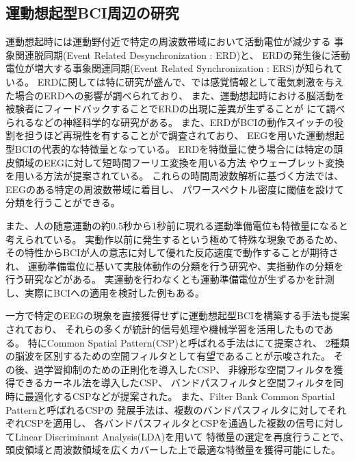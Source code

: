 \subsection{\mc 運動想起型\rm BCI\mc 周辺の研究}
運動想起時には運動野付近で特定の周波数帯域において活動電位が減少する
事象関連脱同期(Event Related Desynchronization : ERD)と、
ERDの発生後に活動電位が増大する事象関連同期(Event Related Synchronization : ERS)が知られている\cite{ERDとERS}。
ERDに関しては特に研究が盛んで、\cite{ERDリハビリ}では感覚情報として電気刺激を与えた場合のERDへの影響が調べられており、
また、運動想起時における脳活動を被験者にフィードバックすることでERDの出現に差異が生ずることが\cite{運動フィードバック}
にて調べられるなどの神経科学的な研究がある。
また、ERDがBCIの動作スイッチの役割を担うほど再現性を有することが\cite{Beta波によるBCI}で調査されており、
EEGを用いた運動想起型BCIの代表的な特徴量となっている。
ERDを特徴量に使う場合には特定の頭皮領域のEEGに対して短時間フーリエ変換を用いる方法
\cite{プリミティブERD}やウェーブレット変換を用いる方法\cite{waveletFSVM}が提案されている。
これらの時間周波数解析に基づく方法では、EEGのある特定の周波数帯域に着目し、
パワースペクトル密度に閾値を設けて分類を行うことができる。

また、人の随意運動の約0.5秒から1秒前に現れる運動準備電位も特徴量になると考えられている。
実動作以前に発生するという極めて特殊な現象であるため、
その特性からBCIが人の意志に対して優れた反応速度で動作することが期待され、
運動準備電位に基いて実肢体動作の分類を行う研究\cite{運動準備電位肢体}や、実指動作の分類を行う研究\cite{運動準備電位指}などがある。
実運動を行わなくとも運動準備電位が生ずるかを計測し\cite{運動準備電位想起}、実際にBCIへの適用を検討した例\cite{運動準備電位想起2}もある。

一方で特定のEEGの現象を直接獲得せずに運動想起型BCIを構築する手法も提案されており、
それらの多くが統計的信号処理や機械学習を活用したものである。
特にCommon Spatial Pattern(CSP)と呼ばれる手法は\cite{CSP1990}にて提案され、
2種類の脳波を区別するための空間フィルタとして有望であることが示唆された。
その後、過学習抑制のための正則化を導入したCSP\cite{正則化CSP}、
非線形な空間フィルタを獲得できるカーネル法を導入したCSP\cite{カーネルCSP}、
バンドパスフィルタと空間フィルタを同時に最適化するCSP\cite{csssp}などが提案された。
また、Filter Bank Common Spartial Pattern\cite{fbcsp}と呼ばれるCSPの
発展手法は、複数のバンドパスフィルタに対してそれぞれCSPを適用し、
各バンドパスフィルタとCSPを通過した複数の信号に対してLinear Discriminant Analysis(LDA)を用いて
特徴量の選定を再度行うことで、
頭皮領域と周波数領域を広くカバーした上で最適な特徴量を獲得可能にした。

